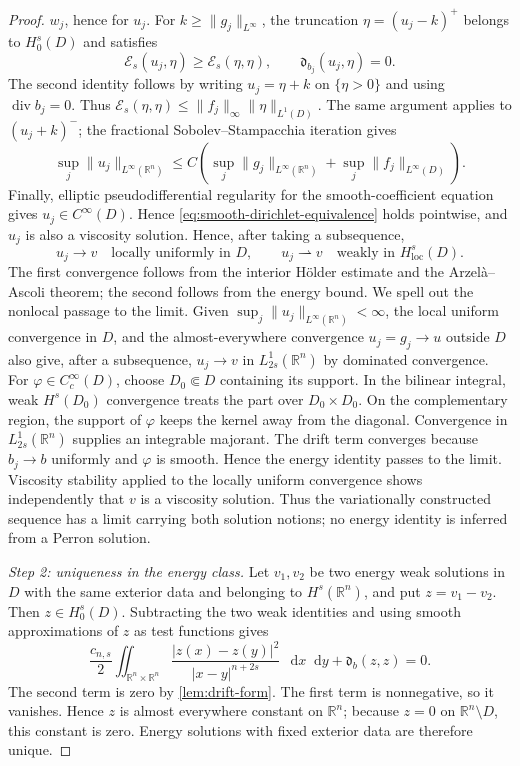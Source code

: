 \documentclass[10pt,a4paper]{amsart}
\numberwithin{equation}{section}
\newcommand{\R}{\mathbb R}
\newcommand{\differential}{\mathop{}\!\mathrm d}
\DeclareMathOperator{\divergence}{div}
\newcommand{\rev}[1]{#1}
\begin{document}
\begin{proof}
$w_j$, hence for $u_j$.  For $k\ge\|g_j\|_{L^\infty}$, the truncation
$\eta=(u_j-k)^+$ belongs to $H_0^s(D)$ and satisfies
\[
 \mathcal E_s(u_j,\eta)\ge\mathcal E_s(\eta,\eta),
 \qquad \mathfrak d_{b_j}(u_j,\eta)=0.
\]
The second identity follows by writing $u_j=\eta+k$ on $\{\eta>0\}$
and using $\divergence b_j=0$.  Thus
$\mathcal E_s(\eta,\eta)\le\|f_j\|_\infty\|\eta\|_{L^1(D)}$.
The same argument applies to $(u_j+k)^-$; the fractional
Sobolev--Stampacchia iteration gives
\[
 \sup_j\|u_j\|_{L^\infty(\R^n)}
 \le C\left(\sup_j\|g_j\|_{L^\infty(\R^n)}
             +\sup_j\|f_j\|_{L^\infty(D)}\right).
\]
Finally, elliptic pseudodifferential regularity for
the smooth-coefficient equation gives $u_j\in C^\infty(D)$.  Hence
\eqref{eq:smooth-dirichlet-equivalence} holds pointwise, and $u_j$ is also
a viscosity solution.
Hence,
after taking a subsequence,
\begin{equation}\label{eq:two-compactness-modes}
 u_j\to v\quad\text{locally uniformly in }D,
 \qquad u_j\rightharpoonup v\quad\text{weakly in }H^s_{\mathrm{loc}}(D).
\end{equation}
The first convergence follows from the interior H\"older estimate and the
Arzel\`a--Ascoli theorem; the second follows from the energy bound.  We spell
out the nonlocal passage to the limit.  Given
$\sup_j\|u_j\|_{L^\infty(\R^n)}<\infty$, the local uniform convergence in
$D$, and the almost-everywhere convergence $u_j=g_j\to u$ outside $D$
also give, after a subsequence,
$u_j\to v$ in $L^1_{2s}(\R^n)$ by dominated convergence.  For
$\varphi\in C_c^\infty(D)$, choose $D_0\Subset D$ containing its support.
In the bilinear integral, weak $H^s(D_0)$ convergence treats the part over
$D_0\times D_0$.  \rev{On the complementary region, the support of
$\varphi$ keeps the kernel away from the diagonal.}  Convergence in
$L^1_{2s}(\R^n)$ supplies an integrable majorant.  The drift term converges
because $b_j\to b$ uniformly and $\varphi$ is smooth.  Hence the energy
identity passes to the limit.  Viscosity stability applied to the locally
uniform convergence shows independently that $v$ is a viscosity solution.
Thus the variationally constructed sequence has a limit carrying both
solution notions; no energy identity is inferred from a Perron solution.
\endgroup

\smallskip
\noindent\emph{Step 2: uniqueness in the energy class.}
Let $v_1,v_2$ be two energy weak solutions in $D$ with the same exterior
data and belonging to $H^s(\R^n)$, and put $z=v_1-v_2$.  Then
$z\in H_0^s(D)$.  Subtracting the two weak
identities and using smooth approximations of $z$ as test functions gives
\[
 \frac{c_{n,s}}2\iint_{\R^n\times\R^n}
 \frac{|z(x)-z(y)|^2}{|x-y|^{n+2s}}\,\differential x\differential y
 +\mathfrak d_b(z,z)=0.
\]
The second term is zero by \cref{lem:drift-form}.  The first term is
nonnegative, so it vanishes.  Hence $z$ is almost everywhere constant on
$\R^n$; because $z=0$ on $\R^n\setminus D$, this constant is zero.  Energy
solutions with fixed exterior data are therefore unique.


\end{proof}
\end{document}

